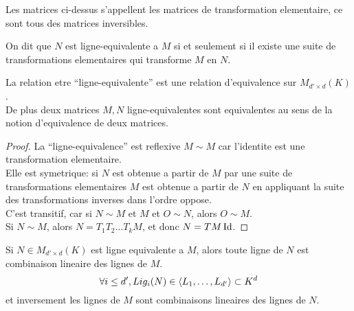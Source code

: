 \documentclass[../main.tex]{subfiles}
\begin{document}
Les matrices ci-dessus s'appellent les matrices de transformation elementaire, ce sont tous des matrices inversibles.\\
\begin{defn}
On dit que $N$ est ligne-equivalente a $M$ si et seulement si il existe une suite de transformations elementaires qui transforme $M$ en $N$.
\end{defn}
\begin{propo}
	La relation etre ``ligne-equivalente'' est une relation d'equivalence sur $M_{d'\times d} ( K)$.\\
De plus deux matrices $M,N$ ligne-equivalentes sont equivalentes au sens de la notion d'equivalence de deux matrices.
\end{propo}
\begin{proof}
La ``ligne-equivalence'' est reflexive $M \sim M$ car l'identite est une transformation elementaire.\\
Elle est symetrique: si $N$ est obtenue a partir de $M$ par une suite de transformations elementaires $M$ est obtenue a partir de $N$ en appliquant la suite des transformations inverses dans l'ordre oppose.\\
C'est transitif, car si  $N \sim M$ et $M$ et $O\sim N$, alors $O \sim M$.\\
Si $N \sim M$, alors $N= T_1T_2\ldots T_k M$, et donc $N=TM\operatorname*{Id}$.			
\end{proof}
\begin{propo}
	Si $N \in M_{d'\times d} ( K) $ est ligne equivalente a $M$, alors toute ligne de $N$ est combinaison lineaire des lignes de $M$.
	\[ 
		\forall i \leq d', Lig_i( N)  \in \left\langle L_1,\ldots, L_{d'} \right\rangle \subset K^{d}
	\]
	et inversement les lignes de $M$ sont combinaisons lineaires des lignes de $N$.
\end{propo}
\end{document}
